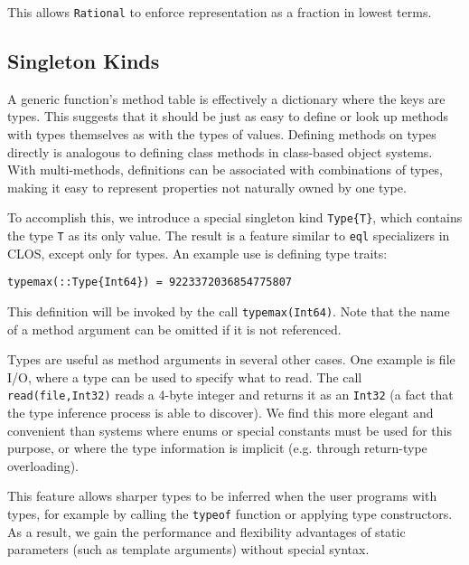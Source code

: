 \documentclass[9pt]{sigplanconf}
\begin{document}
This allows {\tt Rational} to enforce representation as a fraction in
lowest terms.

\subsection{Singleton Kinds}

A generic function's method table is effectively a dictionary where the keys
are types. This suggests that it should be just as easy to define or look up
methods with types themselves as with the types of values. Defining methods on
types directly is analogous to defining class methods in class-based object
systems. With multi-methods, definitions can be associated with combinations
of types, making it easy to represent properties not naturally owned by one
type.

To accomplish this, we introduce a special singleton kind {\tt Type\{T\}},
which contains the type {\tt T} as its only value.
The result is a feature similar to {\tt eql}
specializers in CLOS, except only for types. An example use is defining
type traits:

\begin{verbatim}
typemax(::Type{Int64}) = 9223372036854775807
\end{verbatim}

This definition will be invoked by the call {\tt typemax(Int64)}. Note that
the name of a method argument can be omitted if it is not referenced.

Types are useful as method arguments in several other cases. One example is
file I/O, where a type can be used to specify what to read. The call
{\tt read(file,Int32)} reads a 4-byte integer and returns it as an {\tt Int32}
(a fact that the type inference process is able to discover). We find this
more elegant and convenient than systems where enums or special constants must
be used for this purpose, or where the type information is implicit
(e.g. through return-type overloading).

This feature allows sharper types to be inferred when the user programs
with types, for example by calling the {\tt typeof} function or applying
type constructors. As a result, we gain the performance and flexibility
advantages of static parameters (such as template arguments) without special
syntax.
\end{document}
